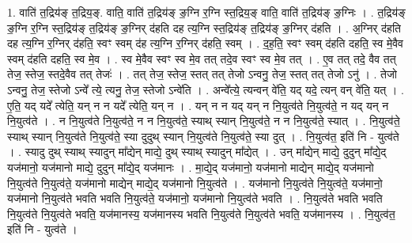 \documentclass[17pt]{extarticle}
\begin{document}
1. वाति॑ त॒द्रिय॑ङ् त॒द्रिय॒ङ्. वाति॒ वाति॑ त॒द्रिय॑ङ् ङ॒ग्नि र॒ग्नि स्त॒द्रिय॒ङ् वाति॒ वाति॑ त॒द्रिय॑ङ् ङ॒ग्निः । . त॒द्रिय॑ङ् ङ॒ग्नि र॒ग्नि स्त॒द्रिय॑ङ् त॒द्रिय॑ङ् ङ॒ग्निर् द॑हति दह त्य॒ग्नि स्त॒द्रिय॑ङ् त॒द्रिय॑ङ् ङ॒ग्निर् द॑हति । . अ॒ग्निर् द॑हति दह त्य॒ग्नि र॒ग्निर् द॑हति॒ स्वꣳ स्वम् द॑ह त्य॒ग्नि र॒ग्निर् द॑हति॒ स्वम् । . द॒ह॒ति॒ स्वꣳ स्वम् द॑हति दहति॒ स्व मे॒वैव स्वम् द॑हति दहति॒ स्व मे॒व । . स्व मे॒वैव स्वꣳ स्व मे॒व तत् तदे॒व स्वꣳ स्व मे॒व तत् । . ए॒व तत् तदे॒ वैव तत् तेज॒ स्तेज॒ स्तदे॒वैव तत् तेजः॑ । . तत् तेज॒ स्तेज॒ स्तत् तत् तेजो ऽन्वनु॒ तेज॒ स्तत् तत् तेजो ऽनु॑ । . तेजो ऽन्वनु॒ तेज॒ स्तेजो ऽन्वे᳚ त्ये॒ त्यनु॒ तेज॒ स्तेजो ऽन्वे॑ति । . अन्वे᳚त्ये॒ त्यन्वन् वे॑ति॒ यद् यदे॒ त्यन् वन् वे॑ति॒ यत् । . ए॒ति॒ यद् यदे᳚ त्येति॒ यन् न न यदे᳚ त्येति॒ यन् न । . यन् न न यद् यन् न नि॒युत्व॑ते नि॒युत्व॑ते॒ न यद् यन् न नि॒युत्व॑ते । . न नि॒युत्व॑ते नि॒युत्व॑ते॒ न न नि॒युत्व॑ते॒ स्याथ् स्यान् नि॒युत्व॑ते॒ न न नि॒युत्व॑ते॒ स्यात् । . नि॒युत्व॑ते॒ स्याथ् स्यान् नि॒युत्व॑ते नि॒युत्व॑ते॒ स्या दुदुथ् स्यान् नि॒युत्व॑ते नि॒युत्व॑ते॒ स्या दुत् । . नि॒युत्व॑त॒ इति॑ नि - युत्व॑ते । . स्यादु दुथ् स्याथ् स्यादुन् मा᳚द्येन् माद्ये॒ दुथ् स्याथ् स्यादुन् मा᳚द्येत् । . उन् मा᳚द्येन् माद्ये॒ दुदुन् मा᳚द्ये॒द् यज॑मानो॒ यज॑मानो माद्ये॒ दुदुन् मा᳚द्ये॒द् यज॑मानः । . मा॒द्ये॒द् यज॑मानो॒ यज॑मानो माद्येन् माद्ये॒द् यज॑मानो नि॒युत्व॑ते नि॒युत्व॑ते॒ यज॑मानो माद्येन् माद्ये॒द् यज॑मानो नि॒युत्व॑ते । . यज॑मानो नि॒युत्व॑ते नि॒युत्व॑ते॒ यज॑मानो॒ यज॑मानो नि॒युत्व॑ते भवति भवति नि॒युत्व॑ते॒ यज॑मानो॒ यज॑मानो नि॒युत्व॑ते भवति । . नि॒युत्व॑ते भवति भवति नि॒युत्व॑ते नि॒युत्व॑ते भवति॒ यज॑मानस्य॒ यज॑मानस्य भवति नि॒युत्व॑ते नि॒युत्व॑ते भवति॒ यज॑मानस्य । . नि॒युत्व॑त॒ इति॑ नि - युत्व॑ते । \newline
\end{document}
